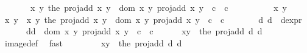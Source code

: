 \begin{isabellebody}
\ \ \ \ \ \ {\isasymsubseteq}\ {\isacharparenleft}{\isasymlambda}{\isacharparenleft}x{\isacharcomma}\ y{\isacharparenright}{\isachardot}\ the\ {\isacharparenleft}proj{\isacharunderscore}add\ x\ y{\isacharparenright}{\isacharparenright}\ {\isacharbackquote}\ {\isacharparenleft}dom\ {\isacharparenleft}{\isasymlambda}{\isacharparenleft}x{\isacharcomma}\ y{\isacharparenright}{\isachardot}\ proj{\isacharunderscore}add\ x\ y{\isacharparenright}\ {\isasyminter}\ c{}\ {\isasymtimes}\ c{}{\isacharparenright}{\isachardoublequoteclose}\isanewline
\ \ \isamarkupfalse%
\ \isanewline
\ \ \ \ \isacommand{{\isacharbraceleft}}\isamarkupfalse%
\isamarkupfalse%
\ x\ y\isanewline
\ \ \ \ \isamarkupfalse%
\ {\isachardoublequoteopen}{\isacharparenleft}x{\isacharcomma}\ y{\isacharparenright}\ {\isasymin}\ {\isacharparenleft}{\isasymlambda}{\isacharparenleft}x{\isacharcomma}\ y{\isacharparenright}{\isachardot}\ the\ {\isacharparenleft}proj{\isacharunderscore}add\ x\ y{\isacharparenright}{\isacharparenright}\ {\isacharbackquote}\ {\isacharparenleft}dom\ {\isacharparenleft}{\isasymlambda}{\isacharparenleft}x{\isacharcomma}\ y{\isacharparenright}{\isachardot}\ proj{\isacharunderscore}add\ x\ y{\isacharparenright}\ {\isasyminter}\ c{}\ {\isasymtimes}\ c{}{\isacharparenright}{\isachardoublequoteclose}\isanewline
\ \ \ \ \isamarkupfalse%
\ \isamarkupfalse%
\ d{}\ d{}\ \ d{\isacharunderscore}expr{\isacharcolon}\ \isanewline
\ \ \ \ \ \ {\isachardoublequoteopen}{\isacharparenleft}d{}{\isacharcomma}d{}{\isacharparenright}\ {\isasymin}\ dom\ {\isacharparenleft}{\isasymlambda}{\isacharparenleft}x{\isacharcomma}\ y{\isacharparenright}{\isachardot}\ proj{\isacharunderscore}add\ x\ y{\isacharparenright}\ {\isasyminter}\ c{}\ {\isasymtimes}\ c{}{\isachardoublequoteclose}\isanewline
\ \ \ \ \ \ {\isachardoublequoteopen}{\isacharparenleft}x{\isacharcomma}y{\isacharparenright}\ {\isacharequal}\ the\ {\isacharparenleft}proj{\isacharunderscore}add\ d{}\ d{}{\isacharparenright}{\isachardoublequoteclose}\isanewline
\ \ \ \ \ \ \isamarkupfalse%
\ image{\isacharunderscore}def\ \isamarkupfalse%
\ fast\isanewline
\ \ \ \ \isamarkupfalse%
\ \isamarkupfalse%
\ {}{\isacharcolon}\ {\isachardoublequoteopen}{\isacharparenleft}x{\isacharcomma}y{\isacharparenright}\ {\isacharequal}\ the\ {\isacharparenleft}proj{\isacharunderscore}add\ d{}\ d{}{\isacharparenright}{\isachardoublequoteclose}\ \ \ \ \ \ \ \ \ \ \ \ \ \isanewline

\end{isabellebody}
